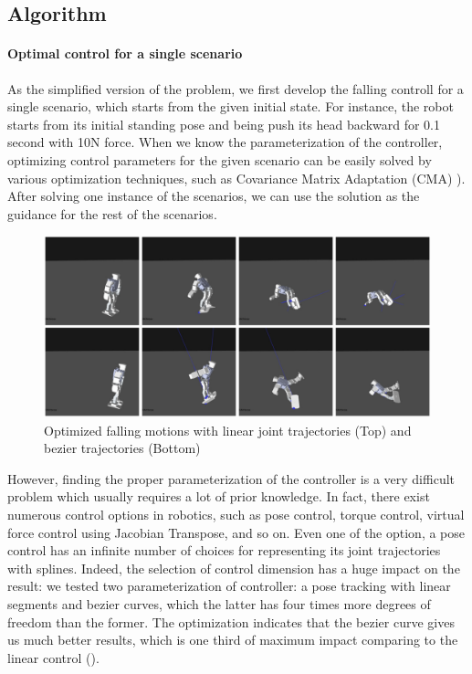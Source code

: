 \subsection{Algorithm}

\paragraph{Optimal control for a single scenario}

As the simplified version of the problem, we first develop the falling
controll for a single scenario, which starts from the given initial 
state.
For instance, the robot starts from its initial standing pose and 
being push its head backward for 0.1 second with 10N force.
When we know the parameterization of the controller, optimizing
control parameters for the given scenario can be easily solved
by various optimization techniques, such as 
Covariance Matrix Adaptation (CMA) \cite{Hansen:2004:CMA}).
After solving one instance of the scenarios, we can use the solution
as the guidance for the rest of the scenarios.

\begin{figure}[htbp]
\center
  \includegraphics[width=\linewidth]{images/falling2_result}
  \caption{Optimized falling motions with linear joint trajectories (Top)
    and bezier trajectories (Bottom)}

 \label{fig:robotFalling}
\end{figure}

However, finding the proper parameterization of the controller
is a very difficult problem which usually requires a lot of prior knowledge.
In fact, there exist numerous control options in robotics, such as
pose control, torque control, virtual force control using Jacobian
Transpose, and so on.
Even one of the option, a pose control has an infinite number of choices for
representing its joint trajectories with splines.
Indeed, the selection of control dimension has a huge impact on the
result: we tested two parameterization of controller: a pose tracking 
with linear segments and bezier curves, which the latter has four times
more degrees of freedom than the former.
The optimization indicates that the bezier curve gives us 
much better results, which is one third of maximum impact
comparing to the linear control ().

